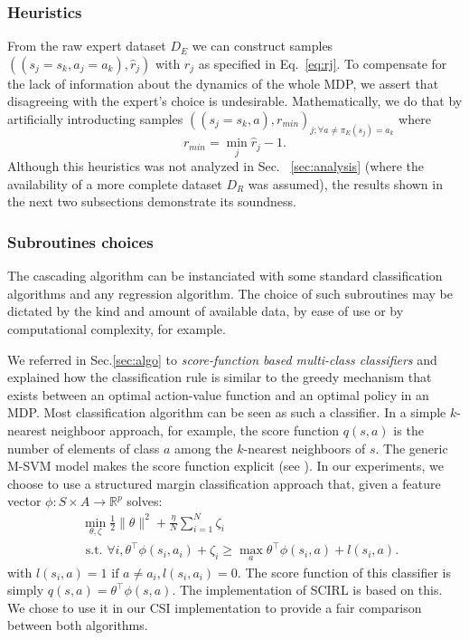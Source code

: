 \documentclass[smallextended]{svjour3}
\begin{document}
\subsubsection{Heuristics}
\label{subsubsec:heuristics}
From the raw expert dataset $D_E$ we can construct samples $((s_j=s_k,a_j=a_k),\hat r_j)$ with $\hat r_j$ as specified in Eq.~\eqref{eq:rj}. To compensate for the lack of information about the dynamics of the whole MDP, we assert that disagreeing with the expert's choice is undesirable. Mathematically, we do that by artificially introducting samples $((s_j=s_k,a),r_{min})_{j;\forall a\neq \pi_E(s_j) = a_k}$ where
\begin{equation}
  r_{min} = \min_j\hat r_j - 1.
\end{equation}
Although this heuristics was not analyzed in Sec.~ \ref{sec:analysis} (where the availability of a more complete dataset $D_R$ was assumed), the results shown in the next two subsections demonstrate its soundness.
\subsubsection{Subroutines choices}
\label{subsubsec:subroutines}
The cascading algorithm can be instanciated with some standard classification algorithms and any regression algorithm. The choice of such subroutines may be dictated by the kind and amount of available data, by ease of use or by computational complexity, for example.

We referred in Sec.\ref{sec:algo} to \emph{score-function based multi-class classifiers} and explained how the classification rule is similar to the greedy mechanism that exists between an optimal action-value function and an optimal policy in an MDP. Most classification algorithm can be seen as such a classifier. In a simple $k$-nearest neighboor approach, for example, the score function $q(s,a)$ is the number of elements of class $a$ among the $k$-nearest neighboors of $s$. The generic M-SVM model makes the score function explicit (see \cite{guermeur2011generic}). In our experiments, we choose to use a structured margin classification approach \cite{taskar2005learning} that, given a feature vector $\phi: S\times A \rightarrow \mathbb{R}^p$ solves:
\begin{eqnarray*}
  &\min_{\theta,\zeta}\frac{1}{2}\|\theta\|^2 +
  \frac{\eta}{N}\sum_{i=1}^N \zeta_i \\
  &\text{~s.t.~} \forall i,
  \theta^\top{\phi}(s_i,a_i)+\zeta_i \geq \max_a \theta^\top
  {\phi}(s_i,a) + l(s_i,a). \label{eq:qp_taskar}
\end{eqnarray*}
with $l(s_i,a) = 1\textrm{ if } a\neq a_i,l(s_i,a_i)=0$. The score function of this classifier is simply $q(s,a) = \theta^\top \phi(s,a)$. The implementation of SCIRL \cite{klein2012scirl} is based on this. We chose to use it in our CSI implementation to provide a fair comparison between both algorithms.
\end{document}
